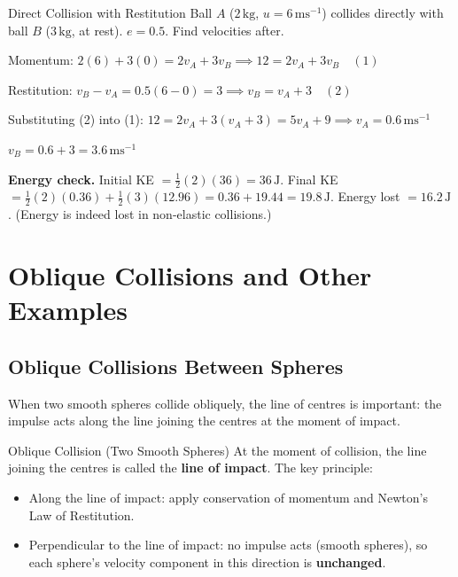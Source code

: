 \documentclass[12pt, a4paper]{book}
\newcommand{\ms}{\,\mathrm{ms}^{-1}}
\newcommand{\kg}{\,\mathrm{kg}}
\begin{document}
\begin{exmp}{Direct Collision with Restitution}{}
Ball $A$ ($2\kg$, $u = 6\ms$) collides directly with ball $B$ ($3\kg$, at rest). $e = 0.5$. Find velocities after.

\medskip
Momentum: $2(6) + 3(0) = 2v_A + 3v_B \implies 12 = 2v_A + 3v_B \quad (1)$

Restitution: $v_B - v_A = 0.5(6-0) = 3 \implies v_B = v_A + 3 \quad (2)$

Substituting (2) into (1): $12 = 2v_A + 3(v_A + 3) = 5v_A + 9 \implies v_A = 0.6\ms$

$v_B = 0.6 + 3 = 3.6\ms$

\textbf{Energy check.} Initial KE $= \frac{1}{2}(2)(36) = 36\,\mathrm{J}$.
Final KE $= \frac{1}{2}(2)(0.36) + \frac{1}{2}(3)(12.96) = 0.36 + 19.44 = 19.8\,\mathrm{J}$.
Energy lost $= 16.2\,\mathrm{J}$. (Energy is indeed lost in non-elastic collisions.)
\end{exmp}

\section{Oblique Collisions and Other Examples}

\subsection{Oblique Collisions Between Spheres}

When two smooth spheres collide obliquely, the line of centres is important: the impulse acts along the line joining the centres at the moment of impact.

\begin{defn}{Oblique Collision (Two Smooth Spheres)}{}
At the moment of collision, the line joining the centres is called the \textbf{line of impact}. The key principle:
\begin{itemize}[leftmargin=1.5em]
  \item Along the line of impact: apply conservation of momentum and Newton's Law of Restitution.
  \item Perpendicular to the line of impact: no impulse acts (smooth spheres), so each sphere's velocity component in this direction is \textbf{unchanged}.
\end{itemize}
\end{defn}
\end{document}
